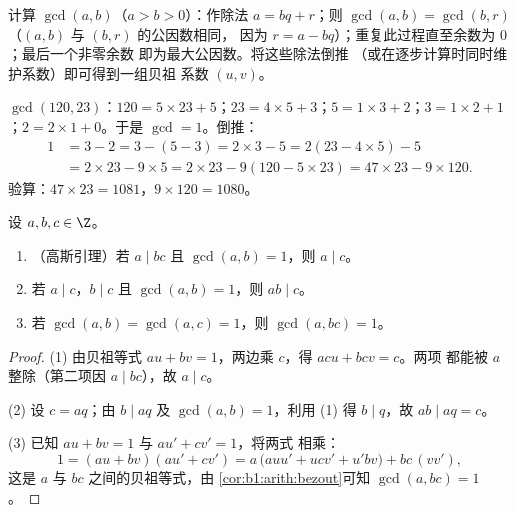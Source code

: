 \begin{method}[扩展的欧几里得算法]\label{met:b1:arith:euclid}
计算 $\gcd(a, b)$（$a > b > 0$）：作除法 $a = bq + r$；则
$\gcd(a, b) = \gcd(b, r)$（$(a,b)$ 与 $(b,r)$ 的公因数相同，
因为 $r = a - bq$）；重复此过程直至余数为 $0$；最后一个非零余数
即为最大公因数。将这些除法倒推
（或在逐步计算时同时维护系数）即可得到一组贝祖
系数 $(u, v)$。
\end{method}

\begin{example}\label{ex:b1:arith:euclid}
$\gcd(120, 23)$：$120 = 5 \times 23 + 5$；$23 = 4 \times 5 + 3$；$5 =
1\times 3 + 2$；$3 = 1 \times 2 + 1$；$2 = 2 \times 1 + 0$。于是
$\gcd = 1$。倒推：
\begin{align*}
1 &= 3 - 2 = 3 - (5 - 3) = 2\times 3 - 5 = 2(23 - 4\times 5) - 5 \\
&= 2 \times 23 - 9 \times 5 = 2\times 23 - 9(120 - 5\times 23)
= 47 \times 23 - 9 \times 120 .
\end{align*}
验算：$47 \times 23 = 1081$，$9 \times 120 = 1080$。
\end{example}

\begin{theorem}[高斯引理及其推论]\label{thm:b1:arith:gauss}
设 $a, b, c \in \Z$。
\begin{enumerate}
  \item （高斯引理）若 $a \mid bc$ 且
        $\gcd(a, b) = 1$，则 $a \mid c$。
  \item 若 $a \mid c$，$b \mid c$ 且 $\gcd(a,b) = 1$，则 $ab \mid
        c$。
  \item 若 $\gcd(a, b) = \gcd(a, c) = 1$，则 $\gcd(a, bc) = 1$。
\end{enumerate}
\end{theorem}

\begin{proof}
(1) 由贝祖等式 $au + bv = 1$，两边乘 $c$，得 $acu + bcv = c$。两项
都能被 $a$ 整除（第二项因 $a \mid bc$），故 $a
\mid c$。

(2) 设 $c = aq$；由 $b \mid aq$ 及 $\gcd(a, b) = 1$，利用 (1)
得 $b \mid q$，故 $ab \mid aq = c$。

(3) 已知 $au + bv = 1$ 与 $au' + cv' = 1$，将两式
相乘：
\[
1 = (au + bv)(au' + cv')
= a\,\bigl(auu' + ucv' + u'bv\bigr) + bc\,(vv') ,
\]
这是 $a$ 与 $bc$ 之间的贝祖等式，由
\cref{cor:b1:arith:bezout}可知 $\gcd(a, bc) = 1$。
\end{proof}

